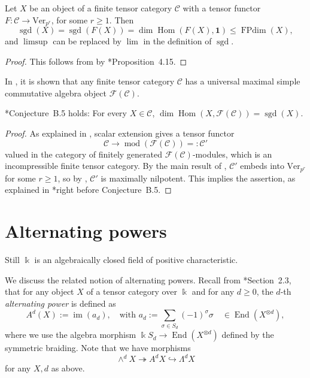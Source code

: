 \documentclass[11pt,oneside]{amsart}
\theoremstyle{definition}
\theoremstyle{remark}
\numberwithin{equation}{section}
\newcommand\cC{\mathcal C}
\newcommand\cF{\mathcal F}
\newcommand\Ver{\mathrm{Ver}}
\newcommand\End{\operatorname{End}}
\newcommand\im{\operatorname{im}}
\newcommand\modfg{\operatorname{mod}}
\renewcommand\o\otimes
\renewcommand\:\colon
\newcommand\one{\mathbf{1}}
\newcommand\kk{\Bbbk}
\newcommand\Hom{\operatorname{Hom}}
\newcommand\sgd{\operatorname{sgd}}
\newcommand\FPdim{\operatorname{FPdim}}
\begin{document}
\begin{proposition} Let $X$ be an object of a finite tensor category $\cC$ with a tensor functor $F\:\cC\to\Ver_{p^r}$, for some $r\ge1$. Then
$$
\sgd(X) = \sgd(F(X)) = \dim\Hom(F(X),\one) \le \FPdim(X),
$$
and $\limsup$ can be replaced by $\lim$ in the definition of $\sgd$.
\end{proposition}

\begin{proof}
    This follows from  by \cite{CF-beo}*{Proposition~4.15}.
\end{proof}


In \cite{CSZ}, it is shown that any finite tensor category $\cC$ has a universal maximal simple commutative algebra object $\cF(\cC)$.

\begin{proposition} \cite{CSZ}*{Conjecture~B.5} holds: For every $X\in\cC$, $\dim\Hom(X,\cF(\cC))=\sgd(X)$.
\end{proposition}

\begin{proof}
As explained in \cite{CSZ}, scalar extension gives a tensor functor
$$
\cC\to \modfg(\cF(\cC)) =: \cC'
$$
valued in the category of finitely generated $\cF(\cC)$-modules, which is an incompressible finite tensor category.  By the main result of \cite{CF-beo}, $\cC'$ embeds into $\Ver_{p^r}$ for some $r\ge1$, so by , $\cC'$ is maximally nilpotent. This implies the assertion, as explained in \cite{CSZ}*{right before Conjecture~B.5}. 
\end{proof}



\section{Alternating powers} \label{sec:alternating}

Still $\kk$ is an algebraically closed field of positive characteristic.

We discuss the related notion of alternating powers. Recall from \cite{CEO-frob}*{Section~2.3}, that for any object $X$ of a tensor category over $\kk$ and for any $d\ge0$, the $d$-th \emph{alternating power} is defined as
$$
A^d(X) := \im( a_d ) ,\quad \text{with }
a_d := \sum_{\sigma\in S_d} (-1)^\sigma \sigma \quad \in\End(X^{\o d}) ,
$$
where we use the algebra morphism $\kk S_d\to\End(X^{\o d})$ defined by the symmetric braiding.
Note that we have morphisms
\begin{equation}
\wedge^d X\twoheadrightarrow A^dX\hookrightarrow \Lambda^d X
\label{eq:ext-powers}    
\end{equation}
for any $X,d$ as above.
\end{document}
